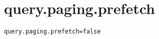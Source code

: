 \section{query.paging.prefetch}
\label{configuration:QueryPagingPrefetch}
\AvailableInJavaOnly{\TODO}
\begin{lstlisting}[style=Props,caption={Usage example for \textit{query.paging.prefetch}}]
query.paging.prefetch=false
\end{lstlisting}